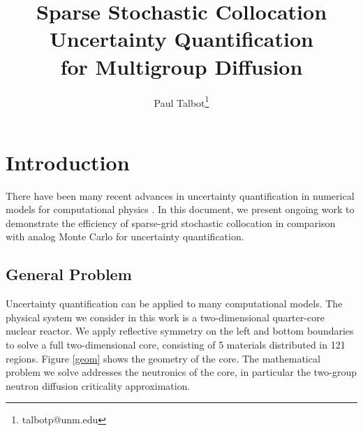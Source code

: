 \documentclass[11pt]{article}
\begin{document}
\title{Sparse Stochastic Collocation \\Uncertainty Quantification \\for Multigroup Diffusion}

\author[]{Paul Talbot\thanks{talbotp@unm.edu}}
\renewcommand\Authands{ and }
\maketitle
\newpage
\section{Introduction}
There have been many recent advances in uncertainty quantification in numerical models for computational physics \cite{SCLagrange}.  In this document, we present ongoing work to demonstrate the efficiency of sparse-grid stochastic collocation \cite{sparseSC} in comparison with analog Monte Carlo for uncertainty quantification.

\subsection{General Problem}
Uncertainty quantification can be applied to many computational models.  The physical system we consider in this work is a two-dimensional quarter-core nuclear reactor. We apply reflective symmetry on the left and bottom boundaries to solve a full two-dimensional core, consisting of 5 materials distributed in 121 regions.  Figure \ref{geom} shows the geometry of the core.  The mathematical problem we solve addresses the neutronics of the core, in particular the two-group neutron diffusion criticality approximation.
\end{document}
